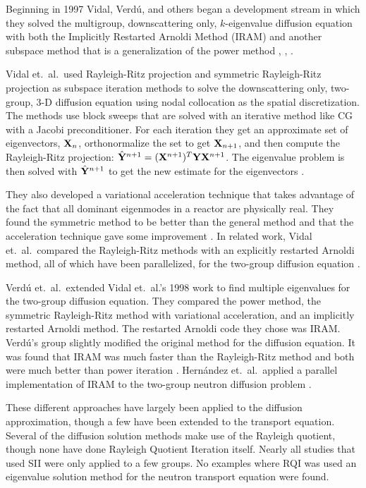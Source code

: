Beginning in 1997 Vidal, Verd\'u, and others began a development stream in which they solved the multigroup, downscattering only, $k$-eigenvalue diffusion equation with both the Implicitly Restarted Arnoldi Method (IRAM) and another subspace method that is a generalization of the power method \cite{Vidal1997}, \cite{Vidal1998}, \cite{Verdu1999}. 

Vidal et.\ al.\ used Rayleigh-Ritz projection and symmetric Rayleigh-Ritz projection as subspace iteration methods to solve the downscattering only, two-group, 3-D diffusion equation using nodal collocation as the spatial discretization. The methods use block sweeps that are solved with an iterative method like CG with a Jacobi preconditioner. For each iteration they get an approximate set of eigenvectors, $\mathbf{X}_{n}$, orthonormalize the set to get $\mathbf{X}_{n+1}$, and then compute the Rayleigh-Ritz projection: $\hat{\mathbf{Y}}^{n+1} = (\mathbf{X}^{n+1})^{T} \mathbf{Y} \mathbf{X}^{n+1}$. The eigenvalue problem is then solved with $\hat{\mathbf{Y}}^{n+1}$ to get the new estimate for the eigenvectors \cite{Vidal1998}. 

They also developed a variational acceleration technique that takes advantage of the fact that all dominant eigenmodes in a reactor are physically real. They found the symmetric method to be better than the general method and that the acceleration technique gave some improvement \cite{Vidal1998}. In related work, Vidal et.\ al.\ compared the Rayleigh-Ritz methods with an explicitly restarted Arnoldi method, all of which have been parallelized, for the two-group diffusion equation \cite{Vidal1997}. 

Verd\'u et.\ al.\ extended Vidal et.\ al.'s 1998 work \cite{Vidal1998} to find multiple eigenvalues for the two-group diffusion equation. They compared the power method, the symmetric Rayleigh-Ritz method with variational acceleration, and an implicitly restarted Arnoldi method. The restarted Arnoldi code they chose was IRAM. Verd\'u's group slightly modified the original method for the diffusion equation. It was found that IRAM was much faster than the Rayleigh-Ritz method and both were much better than power iteration \cite{Verdu1999}. Hern\'andez et.\ al.\ applied a parallel implementation of IRAM to the two-group neutron diffusion problem \cite{Hernandez1998}.

These different approaches have largely been applied to the diffusion approximation, though a few have been extended to the transport equation. Several of the diffusion solution methods make use of the Rayleigh quotient, though none have done Rayleigh Quotient Iteration itself. Nearly all studies that used SII were only applied to a few groups. No examples where RQI was used an eigenvalue solution method for the neutron transport equation were found. 

